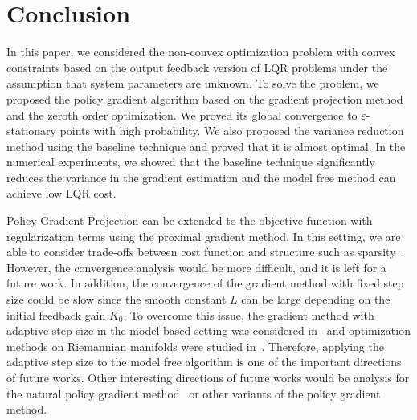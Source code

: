 % 
\section{Conclusion}\label{sec:conclusion}
In this paper, we considered the non-convex optimization problem with convex constraints
based on the output feedback version of LQR problems
under the assumption that system parameters are unknown.
To solve the problem, we proposed the policy gradient algorithm based on the gradient projection method and the zeroth order optimization.
We proved its global convergence to $\varepsilon$-stationary points with high probability.
We also proposed the variance reduction method using the baseline technique and proved that it is almost optimal.
In the numerical experiments, we showed that the baseline technique significantly reduces the variance in the gradient estimation and the model free method can achieve low LQR cost. 

Policy Gradient Projection can be extended to the objective function with regularization terms
using the proximal gradient method. In this setting, we are able to consider trade-offs
between cost function and structure such as sparsity~\cite{park2020structured}.
However, the convergence analysis would be more difficult,
and it is left for a future work.
In addition, the convergence of the gradient method with fixed step size could be slow since the smooth constant $L$ can be large depending on the initial feedback gain $K_0$. To overcome this issue, the gradient method with adaptive step size in the model based setting was considered in~\cite{bu2019lqr} and optimization methods on Riemannian manifolds were studied in~\cite{talebi2022policy}. Therefore, applying the adaptive step size to the model free algorithm is one of the important directions of future works.
Other interesting directions of future works would be
analysis for the natural policy gradient method~\cite{kakade2001natural} or other variants of the policy gradient method.

% 